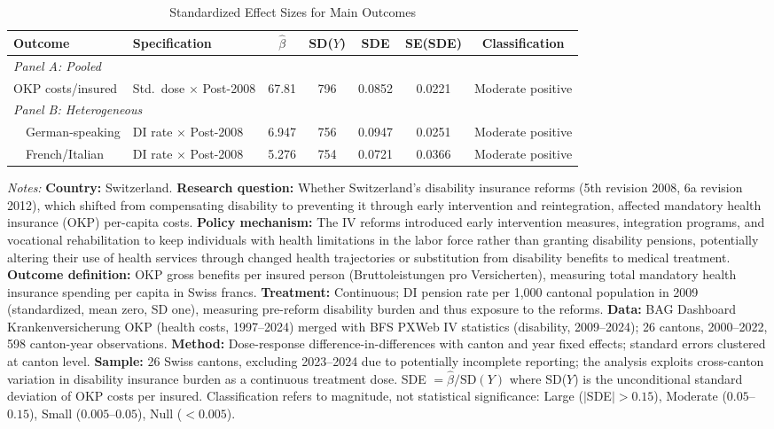 \begin{table}[H]
\centering
\caption{Standardized Effect Sizes for Main Outcomes}
\label{tab:sde}
\begin{adjustbox}{max width=\textwidth}
\begin{tabular}{llccccc}
\toprule
Outcome & Specification & $\hat{\beta}$ & SD($Y$) & SDE & SE(SDE) & Classification \\
\midrule
\multicolumn{7}{l}{\textit{Panel A: Pooled}} \\
OKP costs/insured & Std.\ dose $\times$ Post-2008 & 67.81 & 796 & 0.0852 & 0.0221 & Moderate positive \\
\midrule
\multicolumn{7}{l}{\textit{Panel B: Heterogeneous}} \\
~~German-speaking & DI rate $\times$ Post-2008 & 6.947 & 756 & 0.0947 & 0.0251 & Moderate positive \\
~~French/Italian & DI rate $\times$ Post-2008 & 5.276 & 754 & 0.0721 & 0.0366 & Moderate positive \\
\bottomrule
\end{tabular}
\end{adjustbox}
\par\vspace{0.3em}
{\footnotesize \textit{Notes:} \textbf{Country:} Switzerland. \textbf{Research question:} Whether Switzerland's disability insurance reforms (5th revision 2008, 6a revision 2012), which shifted from compensating disability to preventing it through early intervention and reintegration, affected mandatory health insurance (OKP) per-capita costs. \textbf{Policy mechanism:} The IV reforms introduced early intervention measures, integration programs, and vocational rehabilitation to keep individuals with health limitations in the labor force rather than granting disability pensions, potentially altering their use of health services through changed health trajectories or substitution from disability benefits to medical treatment. \textbf{Outcome definition:} OKP gross benefits per insured person (Bruttoleistungen pro Versicherten), measuring total mandatory health insurance spending per capita in Swiss francs. \textbf{Treatment:} Continuous; DI pension rate per 1,000 cantonal population in 2009 (standardized, mean zero, SD one), measuring pre-reform disability burden and thus exposure to the reforms. \textbf{Data:} BAG Dashboard Krankenversicherung OKP (health costs, 1997--2024) merged with BFS PXWeb IV statistics (disability, 2009--2024); 26 cantons, 2000--2022, 598 canton-year observations. \textbf{Method:} Dose-response difference-in-differences with canton and year fixed effects; standard errors clustered at canton level. \textbf{Sample:} 26 Swiss cantons, excluding 2023--2024 due to potentially incomplete reporting; the analysis exploits cross-canton variation in disability insurance burden as a continuous treatment dose. SDE $= \hat{\beta} / \text{SD}(Y)$ where SD($Y$) is the unconditional standard deviation of OKP costs per insured. Classification refers to magnitude, not statistical significance: Large ($|$SDE$| > 0.15$), Moderate ($0.05$--$0.15$), Small ($0.005$--$0.05$), Null ($< 0.005$).}
\end{table}
